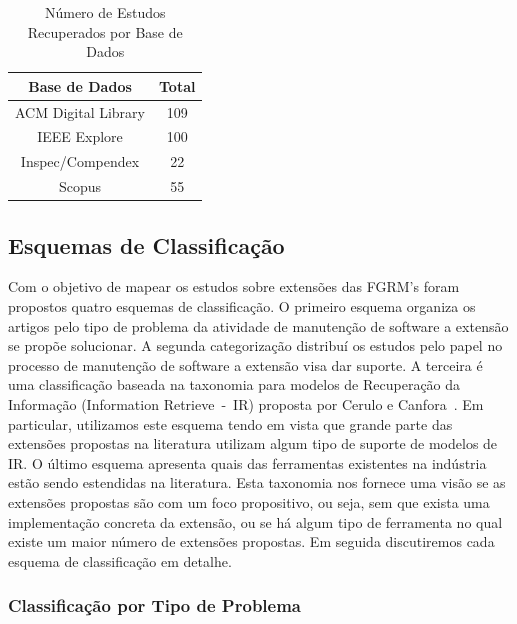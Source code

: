 \begin{table}[htb]
	\centering
	\caption{Número de Estudos Recuperados por Base de Dados}\label{tab:estudos-por-base-dados}
	\begin{tabular}{cc}
		\hline
		\textbf{Base de Dados} & \textbf{Total} \\ \hline
		ACM Digital Library    & 109            \\
		IEEE Explore           & 100            \\
		Inspec/Compendex       & 22             \\
		Scopus                 & 55             \\ \hline
	\end{tabular}

\end{table}

\subsection{Esquemas de Classificação}
\label{subsec:map-esquemas-classificacao}

Com o objetivo de mapear os estudos sobre extensões das FGRM's foram propostos
quatro esquemas de classificação. O primeiro esquema organiza os artigos pelo
tipo de problema da atividade de manutenção de software a extensão se propõe
solucionar. A segunda categorização distribuí os estudos pelo papel no processo
de manutenção de software a extensão visa dar suporte. A terceira é uma
classificação baseada na taxonomia para modelos de Recuperação da Informação
(Information Retrieve~-~IR) proposta por Cerulo e
Canfora~\cite{cerulo2004taxonomy}. Em particular, utilizamos este esquema tendo
em vista que grande parte das extensões propostas na literatura utilizam algum
tipo de suporte de modelos de IR\@. O último esquema apresenta quais das
ferramentas existentes na indústria estão sendo estendidas na literatura. Esta
taxonomia nos fornece uma visão se as extensões propostas são com um foco
propositivo, ou seja, sem que exista uma implementação concreta da extensão, ou
se há algum tipo de ferramenta no qual existe um maior número de extensões
propostas. Em seguida discutiremos cada esquema de classificação em detalhe.

\subsubsection{Classificação por Tipo de Problema}
\label{subsubsec:map-esquema-suporte-problema}

